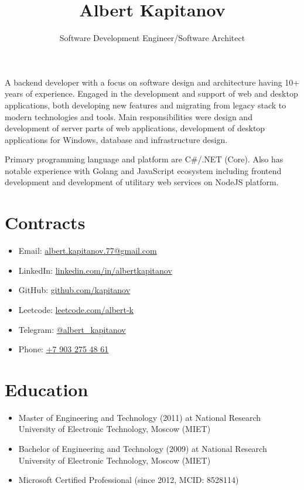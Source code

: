 \documentclass{article}
\title{Albert Kapitanov}
\author{Software Development Engineer/Software Architect}
\date{}
\begin{document}
\maketitle

A backend developer with a focus on software design and architecture having 10+ years of experience.
Engaged in the development and support of web and desktop applications, both developing new features and
migrating from legacy stack to modern technologies and tools.
Main responsibilities were design and development of server parts of
web applications, development of desktop applications for Windows, database and infrastructure
design.

Primary programming language and platform are C\#/.NET (Core). Also has notable experience with Golang and JavaScript ecosystem including frontend development and development of utilitary web services on NodeJS platform.

\section*{Contracts}

\begin{itemize}
  \item Email: \href{mailto:albert.kapitanov.77@gmail.com}{albert.kapitanov.77@gmail.com}
  \item LinkedIn: \href{https://www.linkedin.com/in/albertkapitanov}{linkedin.com/in/albertkapitanov}
  \item GitHub: \href{https://github.com/kapitanov}{github.com/kapitanov}
  \item Leetcode: \href{https://leetcode.com/albert-k}{leetcode.com/albert-k}
  \item Telegram: \href{https://t.me/albert_kapitanov}{@albert\_kapitanov}
  \item Phone: \href{tel:+79032754861}{+7 903 275 48 61}
\end{itemize}

\section*{Education}

\begin{itemize}
    \item {
        Master of Engineering and Technology (2011) at National Research University of
Electronic Technology, Moscow (MIET)
    }
    \item {
        Bachelor of Engineering and Technology (2009) at National Research University of
Electronic Technology, Moscow (MIET)
    }
    \item {
        Microsoft Certified Professional (since 2012, MCID: 8528114)
    }
\end{itemize}
\end{document}
